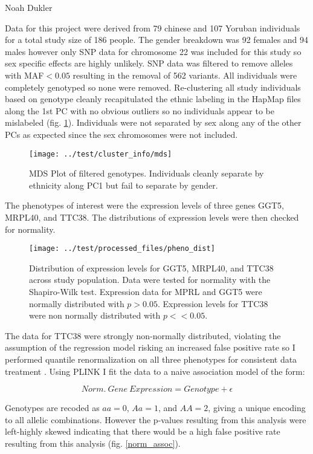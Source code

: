 \documentclass[12pt,a4paper]{article}
\begin{document}
\noindent Noah Dukler

Data for this project were derived from 79 chinese and 107 Yoruban individuals for a total study size of 186 people. The gender breakdown was 92 females and 94 males however only SNP data for chromosome 22 was included for this study so sex specific effects are highly unlikely. SNP data was filtered to remove alleles with MAF$<0.05$ resulting in the removal of 562 variants. All individuals were completely genotyped so none were removed. Re-clustering all study individuals based on genotype cleanly recapitulated the ethnic labeling in the HapMap files along the 1st PC with no obvious outliers so no individuals appear to be mislabeled (fig. \ref{fig:mds}). Individuals were not separated by sex along any of the other PCs as expected since the sex chromosomes were not included.   

\begin{figure}[h]
\centering
\texttt{[image: ../test/cluster\_info/mds]}
\caption[MDS Plot]{MDS Plot of filtered genotypes. Individuals cleanly separate by ethnicity along PC1 but fail to separate by gender.}
\label{fig:mds}
\end{figure}

The phenotypes of interest were the expression levels of three genes GGT5, MRPL40, and TTC38. The distributions of expression levels were then checked for normality. 

\begin{figure}[h]
\centering
\texttt{[image: ../test/processed\_files/pheno\_dist]}
\caption[Pheno_dist]{Distribution of expression levels for GGT5, MRPL40, and TTC38 across study population. Data were tested for normality with the Shapiro-Wilk test. Expression data for MPRL and GGT5 were normally distributed with $p>0.05$. Expression levels for TTC38 were non normally distributed with $p<<0.05$.}
\label{fig:pheno_dist}
\end{figure}

The data for TTC38 were strongly non-normally distributed, violating the assumption of the regression model risking an increased false positive rate so I performed quantile renormalization on all three phenotypes for consistent data treatment \cite{goh_effects_2009}. Using PLINK I fit the data to a naive association model of the form:

$$
	Norm.~Gene~Expression = Genotype + \epsilon
$$

Genotypes are recoded as $aa=0$, $Aa=1$, and $AA=2$, giving a unique encoding to all allelic combinations. However the p-values resulting from this analysis were left-highly skewed indicating that there would be a high false positive rate resulting from this analysis (fig. \ref{norm_assoc}). 
\end{document}
